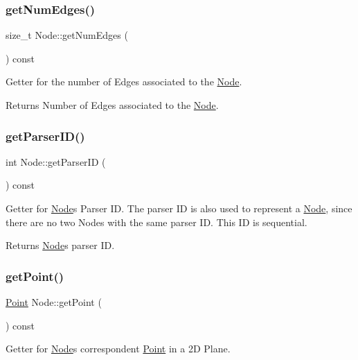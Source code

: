\subsubsection{\texorpdfstring{get\+Num\+Edges()}{getNumEdges()}}
{\footnotesize\ttfamily size\+\_\+t Node\+::get\+Num\+Edges (\begin{DoxyParamCaption}{ }\end{DoxyParamCaption}) const}

Getter for the number of Edges associated to the \hyperlink{class_node}{Node}.

\begin{DoxyReturn}{Returns}
Number of Edges associated to the \hyperlink{class_node}{Node}. 
\end{DoxyReturn}
\hypertarget{class_node_ab79cb8588caac0a2d0dd99d7e7dd2f28}{}\label{class_node_ab79cb8588caac0a2d0dd99d7e7dd2f28} 
\subsubsection{\texorpdfstring{get\+Parser\+I\+D()}{getParserID()}}
{\footnotesize\ttfamily int Node\+::get\+Parser\+ID (\begin{DoxyParamCaption}{ }\end{DoxyParamCaption}) const}

Getter for \hyperlink{class_node}{Node}\textquotesingle{}s Parser ID. The parser ID is also used to represent a \hyperlink{class_node}{Node}, since there are no two Nodes with the same parser ID. This ID is sequential.

\begin{DoxyReturn}{Returns}
\hyperlink{class_node}{Node}\textquotesingle{}s parser ID. 
\end{DoxyReturn}
\hypertarget{class_node_a73562032360227efd9fe93d07ab2475f}{}\label{class_node_a73562032360227efd9fe93d07ab2475f} 
\subsubsection{\texorpdfstring{get\+Point()}{getPoint()}}
{\footnotesize\ttfamily \hyperlink{class_point}{Point} Node\+::get\+Point (\begin{DoxyParamCaption}{ }\end{DoxyParamCaption}) const}

Getter for \hyperlink{class_node}{Node}\textquotesingle{}s correspondent \hyperlink{class_point}{Point} in a 2D Plane.

